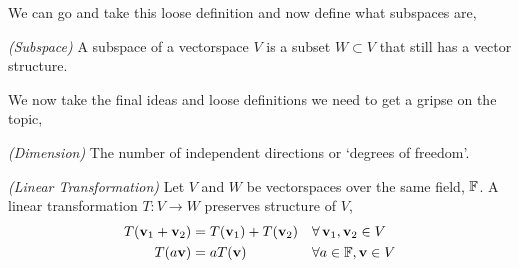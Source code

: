 \documentclass{article}
\begin{document}
  We can go and take this loose definition and now define what subspaces are,
  \begin{ndefi}{\textit{(Subspace)}}
    A subspace of a vectorspace $V$ is a subset $W \subset V$ that still has a vector structure.
  \end{ndefi}
  We now take the final ideas and loose definitions we need to get a gripse on the topic,
  \begin{ndefi}{\textit{(Dimension)}}
    The number of independent directions or `degrees of freedom'.
  \end{ndefi}
  \begin{ndefi}{\textit{(Linear Transformation)}}
    Let $V$ and $W$ be vectorspaces over the same field, $\mathbb{F}$. A linear transformation $T : V \to W$ preserves structure of $V$,
    \begin{align*}
      T(\boldsymbol{\mathbf{v}}_1 + \boldsymbol{\mathbf{v}}_2) &= T(\boldsymbol{\mathbf{v}}_1) + T(\boldsymbol{\mathbf{v}}_2) && \forall\, \boldsymbol{\mathbf{v}}_1, \boldsymbol{\mathbf{v}}_2 \in V\\
      T(a\boldsymbol{\mathbf{v}}) &= aT(\boldsymbol{\mathbf{v}}) && \forall a\in\mathbb{F}, \boldsymbol{\mathbf{v}} \in V
    \end{align*}
  \end{ndefi}
\end{document}
